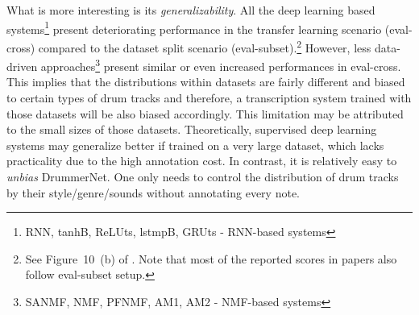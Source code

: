 \documentclass{article}
\begin{document}
	
	What is more interesting is its \textit{generalizability}. 
	All the deep learning based systems\footnote{RNN, tanhB, ReLUts, lstmpB, GRUts - RNN-based systems} present deteriorating performance in the transfer learning scenario (eval-cross) compared to the dataset split scenario (eval-subset).\footnote{See Figure~10~(b) of \cite{wu2018review}. Note that most of the reported scores in papers also follow eval-subset setup.} However, less data-driven approaches\footnote{SANMF, NMF, PFNMF, AM1, AM2 - NMF-based systems} present similar or even increased performances in eval-cross. This implies that the distributions within datasets are fairly different and biased to certain types of drum tracks
	and therefore, a transcription system trained with those datasets will be also biased accordingly. This limitation may be attributed to the small sizes of those datasets. Theoretically, supervised deep learning systems may generalize better if trained on a very large dataset, which lacks practicality due to the high annotation cost. In contrast, it is relatively easy to \textit{unbias} DrummerNet. One only needs to control the distribution of drum tracks by their style/genre/sounds without annotating every note.
	
\end{document}
